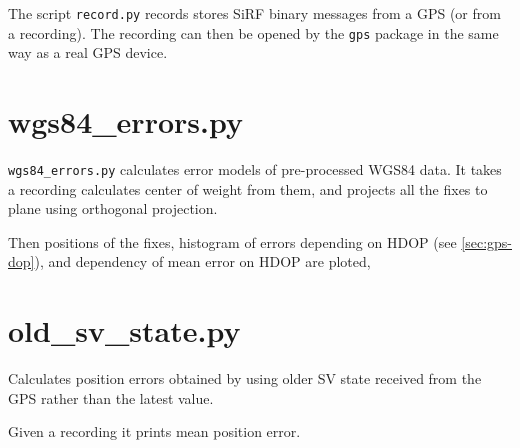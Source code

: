 

The script \verb=record.py= records stores SiRF binary messages from a GPS (or from a recording).
The recording can then be opened by the \lstinline=gps= package in the same way as a real GPS
device.

\section{wgs84\_errors.py}



\verb=wgs84_errors.py= calculates error models of pre-processed WGS84 data.
It takes a recording calculates center of weight from them, and projects all the fixes to plane
using orthogonal projection.

Then positions of the fixes, histogram of errors depending on HDOP (see
\ref{sec:gps-dop}), and dependency of mean error on HDOP are ploted, 

\section{old\_sv\_state.py}



Calculates position errors obtained by using older SV state received from
the GPS rather than the latest value.

Given a recording it prints mean position error.
